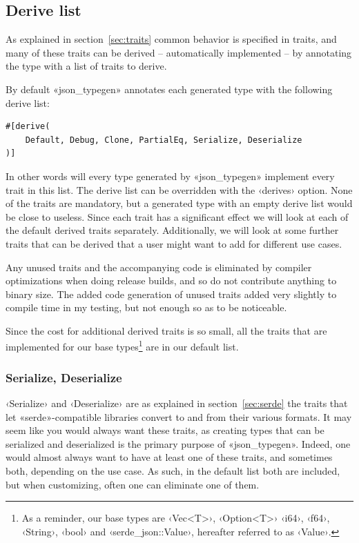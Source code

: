 \subsection{Derive list}
\label{sec:derive-list}

As explained in section~\ref{sec:traits} common behavior is specified in traits, and many of these traits can be derived -- automatically implemented -- by annotating the type with a list of traits to derive.

By default «json_typegen» annotates each generated type with the following derive list:

\begin{verbatim}
#[derive(
    Default, Debug, Clone, PartialEq, Serialize, Deserialize
)]
\end{verbatim}

In other words will every type generated by «json_typegen» implement every trait in this list. The derive list can be overridden with the ‹derives› option. None of the traits are mandatory, but a generated type with an empty derive list would be close to useless. Since each trait has a significant effect we will look at each of the default derived traits separately. Additionally, we will look at some further traits that can be derived that a user might want to add for different use cases.

Any unused traits and the accompanying code is eliminated by compiler optimizations when doing release builds, and so do not contribute anything to binary size. The added code generation of unused traits added very slightly to compile time in my testing, but not enough so as to be noticeable.

Since the cost for additional derived traits is so small, all the traits that are implemented for our base types\footnote{As a reminder, our base types are ‹Vec<T>›, ‹Option<T>› ‹i64›, ‹f64›, ‹String›, ‹bool› and ‹serde_json::Value›, hereafter referred to as ‹Value›.} are in our default list.

\subsubsection{Serialize, Deserialize}

‹Serialize› and ‹Deserialize› are as explained in section~\ref{sec:serde} the traits that let «serde»-compatible libraries convert to and from their various formats. It may seem like you would always want these traits, as creating types that can be serialized and deserialized is the primary purpose of «json_typegen». Indeed, one would almost always want to have at least one of these traits, and sometimes both, depending on the use case. As such, in the default list both are included, but when customizing, often one can eliminate one of them. %

